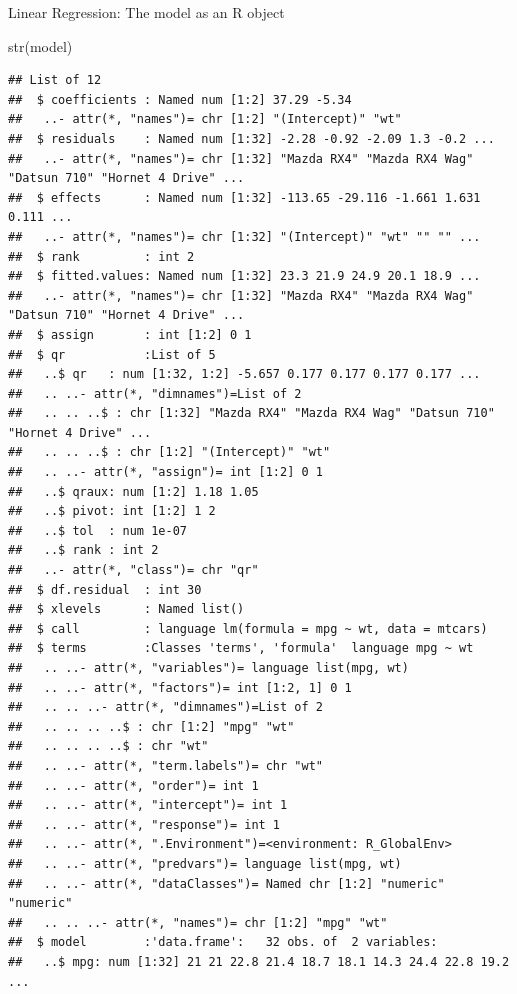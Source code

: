 \documentclass[9pt,ignorenonframetext,]{beamer}
\newenvironment{Shaded}{\begin{snugshade}}{\end{snugshade}}
\newcommand{\KeywordTok}[1]{\textcolor[rgb]{0.94,0.87,0.69}{#1}}
\newcommand{\NormalTok}[1]{\textcolor[rgb]{0.80,0.80,0.80}{#1}}
\begin{document}
\begin{frame}[fragile]{Linear Regression: The model as an R object}
\protect\hypertarget{linear-regression-the-model-as-an-r-object}{}

\begin{Shaded}
\begin{Highlighting}[]
\KeywordTok{str}\NormalTok{(model)}
\end{Highlighting}
\end{Shaded}

\begin{verbatim}
## List of 12
##  $ coefficients : Named num [1:2] 37.29 -5.34
##   ..- attr(*, "names")= chr [1:2] "(Intercept)" "wt"
##  $ residuals    : Named num [1:32] -2.28 -0.92 -2.09 1.3 -0.2 ...
##   ..- attr(*, "names")= chr [1:32] "Mazda RX4" "Mazda RX4 Wag" "Datsun 710" "Hornet 4 Drive" ...
##  $ effects      : Named num [1:32] -113.65 -29.116 -1.661 1.631 0.111 ...
##   ..- attr(*, "names")= chr [1:32] "(Intercept)" "wt" "" "" ...
##  $ rank         : int 2
##  $ fitted.values: Named num [1:32] 23.3 21.9 24.9 20.1 18.9 ...
##   ..- attr(*, "names")= chr [1:32] "Mazda RX4" "Mazda RX4 Wag" "Datsun 710" "Hornet 4 Drive" ...
##  $ assign       : int [1:2] 0 1
##  $ qr           :List of 5
##   ..$ qr   : num [1:32, 1:2] -5.657 0.177 0.177 0.177 0.177 ...
##   .. ..- attr(*, "dimnames")=List of 2
##   .. .. ..$ : chr [1:32] "Mazda RX4" "Mazda RX4 Wag" "Datsun 710" "Hornet 4 Drive" ...
##   .. .. ..$ : chr [1:2] "(Intercept)" "wt"
##   .. ..- attr(*, "assign")= int [1:2] 0 1
##   ..$ qraux: num [1:2] 1.18 1.05
##   ..$ pivot: int [1:2] 1 2
##   ..$ tol  : num 1e-07
##   ..$ rank : int 2
##   ..- attr(*, "class")= chr "qr"
##  $ df.residual  : int 30
##  $ xlevels      : Named list()
##  $ call         : language lm(formula = mpg ~ wt, data = mtcars)
##  $ terms        :Classes 'terms', 'formula'  language mpg ~ wt
##   .. ..- attr(*, "variables")= language list(mpg, wt)
##   .. ..- attr(*, "factors")= int [1:2, 1] 0 1
##   .. .. ..- attr(*, "dimnames")=List of 2
##   .. .. .. ..$ : chr [1:2] "mpg" "wt"
##   .. .. .. ..$ : chr "wt"
##   .. ..- attr(*, "term.labels")= chr "wt"
##   .. ..- attr(*, "order")= int 1
##   .. ..- attr(*, "intercept")= int 1
##   .. ..- attr(*, "response")= int 1
##   .. ..- attr(*, ".Environment")=<environment: R_GlobalEnv> 
##   .. ..- attr(*, "predvars")= language list(mpg, wt)
##   .. ..- attr(*, "dataClasses")= Named chr [1:2] "numeric" "numeric"
##   .. .. ..- attr(*, "names")= chr [1:2] "mpg" "wt"
##  $ model        :'data.frame':   32 obs. of  2 variables:
##   ..$ mpg: num [1:32] 21 21 22.8 21.4 18.7 18.1 14.3 24.4 22.8 19.2 ...

\end{verbatim}
\end{frame}
\end{document}
